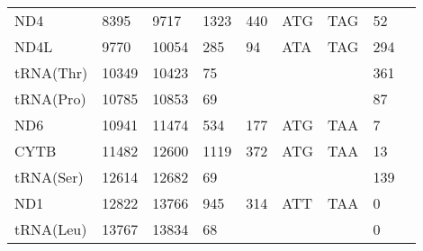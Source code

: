 \documentclass[../DISSERTACAO_MAIN.tex]{subfiles}
\begin{document}
\begin{longtable}{llllllllllllllllllllll}
			ND4          & \multicolumn{2}{l}{8395}    & \multicolumn{2}{l}{9717}    & \multicolumn{2}{l}{1323}        & \multicolumn{3}{l}{440}                       & \multicolumn{3}{l}{ATG}   & \multicolumn{3}{l}{TAG}     & \multicolumn{3}{l}{52}          & \multicolumn{3}{l}{}         \\
			ND4L         & \multicolumn{2}{l}{9770}    & \multicolumn{2}{l}{10054}   & \multicolumn{2}{l}{285}         & \multicolumn{3}{l}{94}                        & \multicolumn{3}{l}{ATA}   & \multicolumn{3}{l}{TAG}     & \multicolumn{3}{l}{294}         & \multicolumn{3}{l}{}         \\
			tRNA(Thr)    & \multicolumn{2}{l}{10349}   & \multicolumn{2}{l}{10423}   & \multicolumn{2}{l}{75}          & \multicolumn{3}{l}{}                          & \multicolumn{3}{l}{}      & \multicolumn{3}{l}{}        & \multicolumn{3}{l}{361}         & \multicolumn{3}{l}{}         \\
			tRNA(Pro)    & \multicolumn{2}{l}{10785}   & \multicolumn{2}{l}{10853}   & \multicolumn{2}{l}{69}          & \multicolumn{3}{l}{}                          & \multicolumn{3}{l}{}      & \multicolumn{3}{l}{}        & \multicolumn{3}{l}{87}          & \multicolumn{3}{l}{}         \\
			ND6          & \multicolumn{2}{l}{10941}   & \multicolumn{2}{l}{11474}   & \multicolumn{2}{l}{534}         & \multicolumn{3}{l}{177}                       & \multicolumn{3}{l}{ATG}   & \multicolumn{3}{l}{TAA}     & \multicolumn{3}{l}{7}           & \multicolumn{3}{l}{}         \\
			CYTB         & \multicolumn{2}{l}{11482}   & \multicolumn{2}{l}{12600}   & \multicolumn{2}{l}{1119}        & \multicolumn{3}{l}{372}                       & \multicolumn{3}{l}{ATG}   & \multicolumn{3}{l}{TAA}     & \multicolumn{3}{l}{13}          & \multicolumn{3}{l}{}         \\
			tRNA(Ser)    & \multicolumn{2}{l}{12614}   & \multicolumn{2}{l}{12682}   & \multicolumn{2}{l}{69}          & \multicolumn{3}{l}{}                          & \multicolumn{3}{l}{}      & \multicolumn{3}{l}{}        & \multicolumn{3}{l}{139}         & \multicolumn{3}{l}{}         \\
			ND1          & \multicolumn{2}{l}{12822}   & \multicolumn{2}{l}{13766}   & \multicolumn{2}{l}{945}         & \multicolumn{3}{l}{314}                       & \multicolumn{3}{l}{ATT}   & \multicolumn{3}{l}{TAA}     & \multicolumn{3}{l}{0}           & \multicolumn{3}{l}{}         \\
			tRNA(Leu)    & \multicolumn{2}{l}{13767}   & \multicolumn{2}{l}{13834}   & \multicolumn{2}{l}{68}          & \multicolumn{3}{l}{}                          & \multicolumn{3}{l}{}      & \multicolumn{3}{l}{}        & \multicolumn{3}{l}{0}           & \multicolumn{3}{l}{}         \\

\end{longtable}
\end{document}
